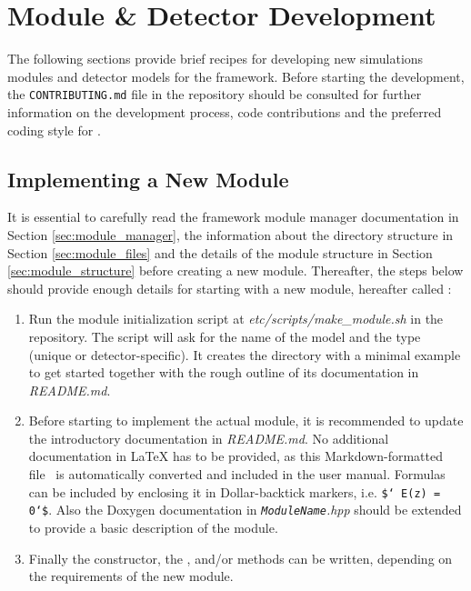 \section{Module \& Detector Development}

The following sections provide brief recipes for developing new simulations modules and detector models for the \apsq framework.
Before starting the development, the \texttt{CONTRIBUTING.md} file in the repository should be consulted for further information on the development process, code contributions and the preferred coding style for \apsq.

\subsection{Implementing a New Module}
\label{sec:building_new_module}

It is essential to carefully read the framework module manager documentation in Section \ref{sec:module_manager}, the information about the directory structure in Section \ref{sec:module_files} and the details of the module structure in Section \ref{sec:module_structure} before creating a new module.
Thereafter, the steps below should provide enough details for starting with a new module, hereafter called :
\begin{enumerate}
\item Run the module initialization script at \textit{etc/scripts/make\_module.sh} in the repository.
The script will ask for the name of the model and the type (unique or detector-specific).
It creates the directory with a minimal example to get started together with the rough outline of its documentation in \textit{README.md}.
\item Before starting to implement the actual module, it is recommended to update the introductory documentation in \textit{README.md}.
No additional documentation in LaTeX has to be provided, as this Markdown-formatted file~\cite{markdown} is automatically converted and included in the user manual.
Formulas can be included by enclosing it in Dollar-backtick markers, i.e. \texttt{\$` E(z) = 0`\$}.
Also the Doxygen documentation in \textit{\texttt{ModuleName}.hpp} should be extended to provide a basic description of the module.
\item Finally the constructor, the ,  and/or  methods can be written, depending on the requirements of the new module.
\end{enumerate}

